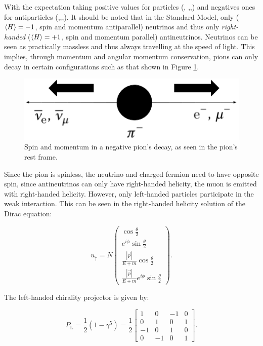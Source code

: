 With the expectation taking positive values for particles (\Pelectron, \Pmuon,\Pnue,\Pnum) and negatives ones for antiparticles (\APelectron,\APmuon,\APnue,\APnum). It should be noted that in the Standard Model, only  ($\Braket{H}=-1$, spin and momentum antiparallel) neutrinos and thus only \textit{right-handed} ($\Braket{H}=+1$, spin and momentum parallel) antineutrinos. Neutrinos can be seen as practically massless and thus always travelling at the speed of light. This implies, through momentum and angular momentum conservation, pions can only decay in certain configurations such as that shown in Figure \ref{fig:helipi}.

\begin{figure}[htbp]
\centering
\includegraphics[width=0.7\linewidth]{./fig/helipi2.png}
\caption{Spin and momentum in a negative pion's decay, as seen in the pion's rest frame.}
\label{fig:helipi}
\end{figure}

Since the pion is spinless, the neutrino and charged fermion need to have opposite spin, since antineutrinos can only have right-handed helicity, the muon is emitted with right-handed helicity. However, only left-handed particles participate in the weak interaction. This can be seen in the right-handed helicity solution of the Dirac equation:

\begin{equation}
u_{\uparrow}=N\begin{pmatrix} \cos{\frac{\theta}{2}} \\ e^{i\phi}\sin{\frac{\theta}{2}} \\ \frac{|\vec{p}|}{E+m}\cos{\frac{\theta}{2}} \\ \frac{|\vec{p}|}{E+m}e^{i\phi}\sin{\frac{\theta}{2}} \end{pmatrix}.
\end{equation}

The left-handed chirality projector is given by:

\begin{equation}
P_{\text{L}}=\frac{1}{2}(1-\gamma^5)=\frac{1}{2} \begin{bmatrix} 1 & 0 & -1 & 0 \\
0 & 1 & 0 & 1 \\
-1 & 0 & 1 & 0 \\
0 & -1 & 0 & 1 \end{bmatrix}.
\end{equation} 

